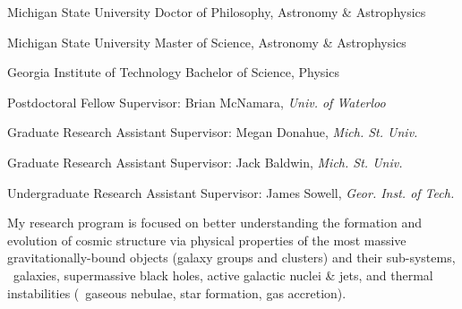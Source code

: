 \documentclass[12pt]{cv}
\begin{document}
\begin{llist}


Michigan State University
Doctor of Philosophy, Astronomy \& Astrophysics

Michigan State University
Master of Science, Astronomy \& Astrophysics

Georgia Institute of Technology
Bachelor of Science, Physics



Postdoctoral Fellow
Supervisor: Brian McNamara, {\textit{Univ. of Waterloo}}

Graduate Research Assistant
Supervisor: Megan Donahue, {\textit{Mich. St. Univ.}}

Graduate Research Assistant
Supervisor: Jack Baldwin, {\textit{Mich. St. Univ.}}

Undergraduate Research Assistant
Supervisor: James Sowell, {\textit{Geor. Inst. of Tech.}}



My research program is focused on better understanding the formation
and evolution of cosmic structure via physical properties of the most
massive gravitationally-bound objects (galaxy groups and clusters) and
their sub-systems, \eg\ galaxies, supermassive black holes, active
galactic nuclei \& jets, and thermal instabilities (\ie\ gaseous
nebulae, star formation, gas accretion).


\end{llist}
\end{document}
